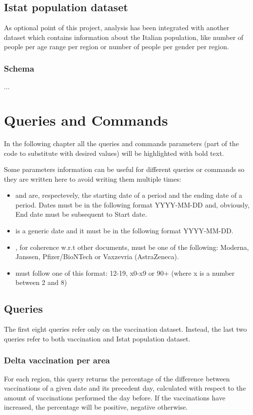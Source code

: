 \documentclass{article}
\begin{document}
\newpage
\subsection{Istat population dataset}
As optional point of this project, analysis has been integrated with another dataset which contains information about the Italian population, like number of people per age range per region or number of people per gender per region.

\subsubsection{Schema}
...

\newpage
\section{Queries and Commands}
In the following chapter all the queries and commands parameters (part of the code to substitute with desired values) will be highlighted with {\color{magenta}{magenta}} bold text.

Some parameters information can be useful for different queries or commands so they are written here to avoid writing them multiple times:
\begin{itemize}
    \item {\color{magenta}{Start date}} and {\color{magenta}{End date}} are, respectevely, the starting date of a period and the ending date of a period. Dates must be in the following format YYYY-MM-DD and, obviously, End date must be subsequent to Start date.
    \item {\color{magenta}{Date}} is a generic date and it must be in the following format YYYY-MM-DD.
    \item {\color{magenta}{Supplier}}, for coherence w.r.t other documents, must be one of the following: Moderna, Janssen, Pfizer/BioNTech or Vaxzevria (AstraZeneca).
    \item {\color{magenta}{Age range}} must follow one of this format: 12-19, x0-x9 or 90+ (where x is a number between 2 and 8)
\end{itemize}
\subsection{Queries}
The first eight queries refer only on the vaccination dataset. Instead, the last two queries refer to both vaccination and Istat population dataset.
\subsubsection{Delta vaccination per area}
For each region, this query returns the percentage of the difference between vaccinations of a given date and its precedent day, calculated with respect to the amount of vaccinations performed the day before.
If the vaccinations have increased, the percentage will be positive, negative otherwise.
\end{document}
